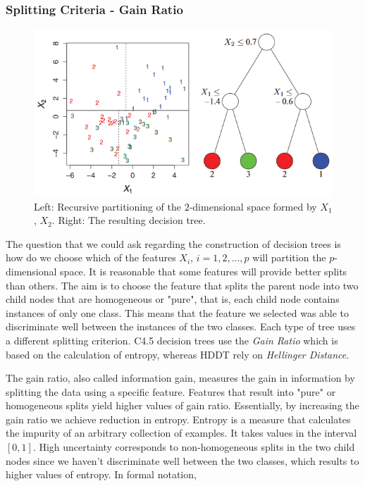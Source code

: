 \documentclass{acm_proc_article-sp}
\begin{document}
\subsubsection{Splitting Criteria - Gain Ratio}

\begin{figure}
	\centering
	\includegraphics[scale=.52]{Partitioning}
	\caption{Left: Recursive partitioning of the $2$-dimensional space formed by $X_1$, $X_2$. Right: The resulting decision tree.}
	\label{Fig1}
\end{figure}	

The question that we could ask regarding the construction of decision trees is how do we choose which of the features $X_i$, $i = 1,2,...,p$ will partition the $p$-dimensional space. It is reasonable that some features will provide better splits than others. The aim is to choose the feature that splits the parent node into two child nodes that are homogeneous or "pure", that is, each child node contains instances of only one class. This means that the feature we selected was able to discriminate well between the instances of the two classes. Each type of tree uses a different splitting criterion. C4.5 decision trees use the \textit{Gain Ratio} which is based on the calculation of entropy, whereas HDDT rely on \textit{Hellinger Distance}.

The gain ratio, also called information gain, measures the gain in information by splitting the data using a specific feature. Features that result into "pure" or homogeneous splits yield higher values of gain ratio. Essentially, by increasing the gain ratio we achieve reduction in entropy. Entropy is a measure that calculates the impurity of an arbitrary collection of examples. It takes values in the interval $[0,1]$. High uncertainty corresponds to non-homogeneous splits in the two child nodes since we haven't discriminate well between the two classes, which results to higher values of entropy. In formal notation,
\end{document}
